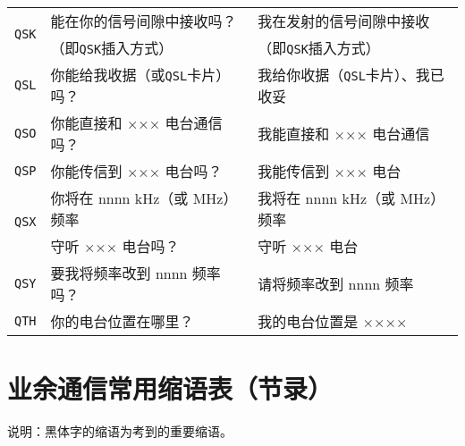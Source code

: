 \begin{longtable}{|l|l|l|}
  \hline
  \multirow{2}{1em}{\texttt{QSK}} & 能在你的信号间隙中接收吗？                         & 我在发射的信号间隙中接收                          \\
                                  & （即\texttt{QSK}插入方式）                   & （即\texttt{QSK}插入方式）                   \\
  \hline
  \texttt{QSL}                    & 你能给我收据（或\texttt{QSL}卡片）吗？             & 我给你收据（\texttt{QSL}卡片）、我已收妥            \\
  \hline
  \texttt{QSO}                    & 你能直接和 ××× 电台通信吗？                      & 我能直接和 ××× 电台通信                        \\
  \hline
  \texttt{QSP}                    & 你能传信到 ××× 电台吗？                        & 我能传信到 ××× 电台                          \\
  \hline
  \multirow{2}{1em}{\texttt{QSX}} & 你将在 nnnn \unit{\kHz}（或 \unit{\MHz}）频率 & 我将在 nnnn \unit{\kHz}（或 \unit{\MHz}）频率 \\
                                  & 守听 ××× 电台吗？                           & 守听 ××× 电台                             \\
  \hline
  \texttt{QSY}                    & 要我将频率改到 nnnn 频率吗？                     & 请将频率改到 nnnn 频率                        \\
  \hline
  \texttt{QTH}                    & 你的电台位置在哪里？                            & 我的电台位置是 ××××                          \\
  \hline
\end{longtable}

\newpage

\section{业余通信常用缩语表（节录）}

说明：黑体字的缩语为考到的重要缩语。

